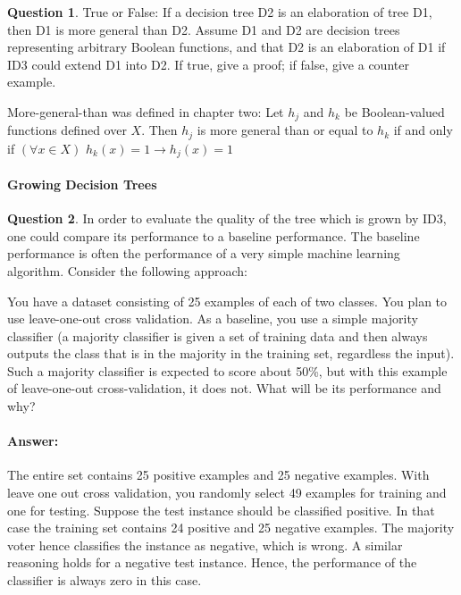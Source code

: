 \documentclass[11pt,a4paper]{article}
\theoremstyle{definition}%
\newtheorem{Q}{Question}[] %
\newcommand{\reponse}[1]{%
\ifthenelse {\boolean{corrige}} {\paragraph{Answer:} \color{darkblue}   #1\color{black}} {}
}
\begin{document}
\begin{Q}
True or False: If a decision tree D2 is an elaboration of tree D1, then D1 is more general than
D2. Assume D1 and D2 are decision trees representing arbitrary Boolean functions, and that D2
is an elaboration of D1 if ID3 could extend D1 into D2. If true, give a proof; if false, give a
counter example.

More-general-than was defined in chapter two: Let $h_j$ and $h_k$ be Boolean-valued functions defined
over $X$. Then $h_j$ is more general than or equal to $h_k$ if and only if 
$(\forall x \in X)$ $h_k(x) = 1 \rightarrow h_j(x) = 1 $

\end{Q}

\paragraph{Growing Decision Trees}
\begin{Q}
In order to evaluate the quality of the tree which is grown by ID3, one could compare its performance
to a baseline performance. The baseline performance is often the performance of a very simple
machine learning algorithm. Consider the following approach:

You have a dataset consisting of 25 examples of each of two classes. You plan to use leave-one-out cross
validation. As a baseline, you use a simple majority classifier (a majority classifier is given a set of
training data and then always outputs the class that is in the majority in the training set, regardless
the input). Such a majority classifier is expected to score about 50\%, but with this example of
leave-one-out cross-validation, it does not. What will be its performance and why?
\reponse{
The entire set contains 25 positive examples and 25 negative examples. With leave one
out cross validation, you randomly select 49 examples for training and one for testing. Suppose the
test instance should be classified positive. In that case the training set contains 24 positive and 25
negative examples. The majority voter hence classifies the instance as negative, which is wrong.
A similar reasoning holds for a negative test instance. Hence, the performance of the classifier is
always zero in this case.
}
\end{Q}
\end{document}
